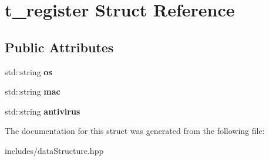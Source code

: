 \section{t\+\_\+register Struct Reference}
\label{structt__register}
\subsection*{Public Attributes}
\begin{DoxyCompactItemize}
\item 
\mbox{\label{structt__register_a1289fd58d08da296ffb3c4a43e2fb03a}} 
std\+::string {\bfseries os}
\item 
\mbox{\label{structt__register_a8f5a2db7cac0cb5cb8034f1b34a2470a}} 
std\+::string {\bfseries mac}
\item 
\mbox{\label{structt__register_abcad59e2da2ca466659dc13f5dfeabde}} 
std\+::string {\bfseries antivirus}
\end{DoxyCompactItemize}


The documentation for this struct was generated from the following file\+:\begin{DoxyCompactItemize}
\item 
includes/data\+Structure.\+hpp\end{DoxyCompactItemize}
